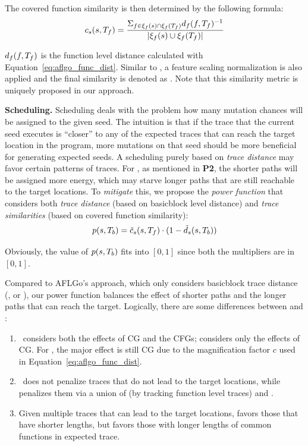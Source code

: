 The covered function similarity is then determined by the following formula:
\begin{equation}
c_s(s, T_f) = \frac{\Sigma_{f\in\xi_f(s)	\cap\xi_f(T_f)}d_f(f,T_f)^{-1}}{|\xi_f(s)\cup\xi_f(T_f)|}
\end{equation}

$d_f(f,T_f)$ is the function level distance calculated with Equation~\ref{eq:aflgo_func_dist}. Similar to \traceDistn, a feature scaling normalization is also applied and the final similarity is denoted as \covDistnN. Note that this similarity metric is uniquely proposed in our approach.

\textbf{Scheduling.}
Scheduling deals with the problem how many mutation chances will be assigned to the given seed. The intuition is that if the trace that the current seed executes is ``closer'' to any of the expected traces that can reach the target location in the program, more mutations on that seed should be more beneficial for generating expected seeds. A scheduling purely based on \emph{trace distance} may favor certain patterns of traces. For \aflgo, as mentioned in \textbf{P2}, the shorter paths will be assigned more energy, which may starve longer paths that are still reachable to the target locations. To \emph{mitigate} this, we propose the \emph{power function} that considers both \emph{trace distance} (based on basicblock level distance) and \emph{trace similarities} (based on covered function similarity): 
\begin{equation}\label{eq:aflgo_power}
p(s, T_b) = \tilde{c}_{s}(s, T_f)\cdot(1 - \tilde{d}_s(s,T_b))
\end{equation}

Obviously, the value of $p(s, T_b)$ fits into $[0,1]$ since both the multipliers are in $[0,1]$.

Compared to AFLGo's approach, which only considers basicblock trace distance (\traceDistn, or \traceDistnFinal), our power function balances the effect of shorter paths and the longer paths that can reach the target. Logically, there are some differences between {\covDistn} and {\traceDistn}:
\begin{enumerate}[(1)]
    \item \traceDistn~considers both the effects of CG and the CFGs; {\covDistn} considers only the effects of CG. For \traceDistn, the major effect is still CG due to the magnification factor $c$ used in Equation~\ref{eq:aflgo_func_dist}.
    \item \traceDistn~does not penalize traces that do not lead to the target locations, while {\covDistn} penalizes them via a union of  (by tracking function level traces) and \fntrace{\tgtfnset}.
    \item Given multiple traces that can lead to the target locations, {\traceDistn} favors those that have shorter lengths, but {\covDistn} favors those with longer lengths of common functions in expected trace.
\end{enumerate}

